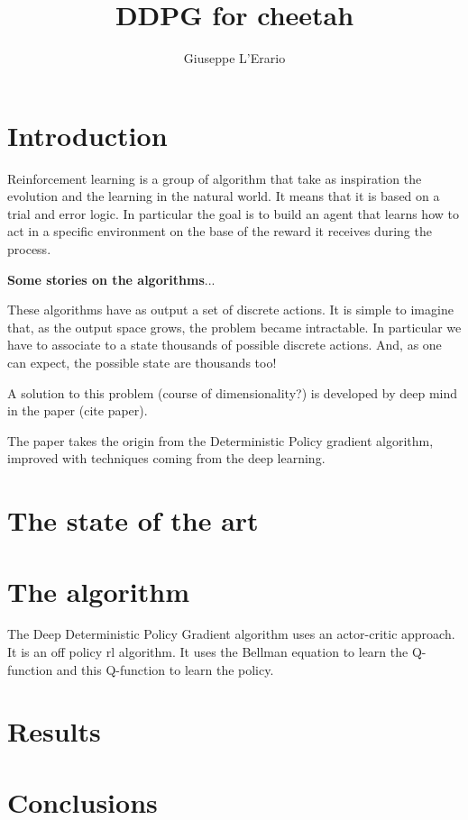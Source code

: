 \documentclass[11pt,a4paper]{scrartcl}
\author{Giuseppe L'Erario}
\date{}
\title{DDPG for cheetah}
\begin{document}
\maketitle
\tableofcontents

\clearpage

\section{Introduction}

Reinforcement learning is a group of algorithm that take as inspiration the evolution and the learning in the natural world. It means that it is based on a trial and error logic. In particular the goal is to build an agent that learns how to act in a specific environment on the base of the reward it receives during the process.

\textbf{Some stories on the algorithms}...

These algorithms have as output a set of discrete actions. It is simple to imagine that, as the output space grows, the problem became intractable. In particular we have to associate to a state thousands of possible discrete actions. And, as one can expect, the possible state are thousands too!

A solution to this problem (course of dimensionality?) is developed by deep mind in the paper (cite paper). 

The paper takes the origin from the Deterministic Policy gradient algorithm, improved with techniques coming from the deep learning. 

\section{The state of the art}

\section{The algorithm}
The Deep Deterministic Policy Gradient algorithm uses an actor-critic approach. It is an off policy rl algorithm. It uses the Bellman equation to learn the Q-function and this Q-function to learn the policy.




\section{Results}

\section{Conclusions}
\end{document}
